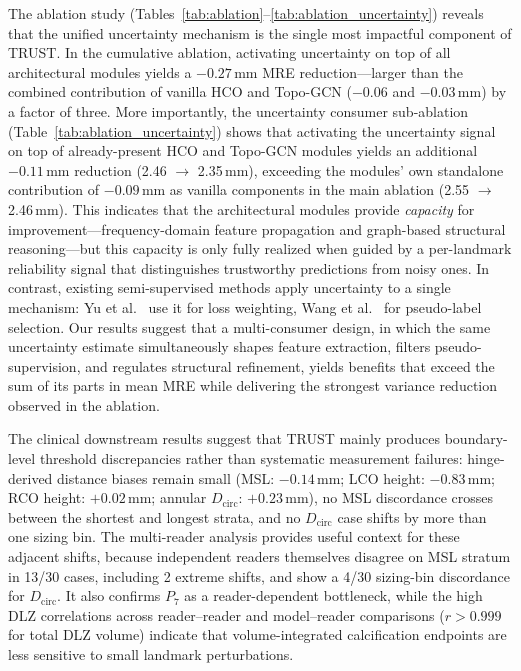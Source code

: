 \documentclass[conference]{IEEEtran}
\begin{document}
The ablation study (Tables~\ref{tab:ablation}--\ref{tab:ablation_uncertainty}) reveals that the unified uncertainty mechanism is the single most impactful component of TRUST. In the cumulative ablation, activating uncertainty on top of all architectural modules yields a $-0.27$\,mm MRE reduction---larger than the combined contribution of vanilla HCO and Topo-GCN ($-0.06$ and $-0.03$\,mm) by a factor of three. More importantly, the uncertainty consumer sub-ablation (Table~\ref{tab:ablation_uncertainty}) shows that activating the uncertainty signal on top of already-present HCO and Topo-GCN modules yields an additional $-0.11$\,mm reduction (2.46 $\to$ 2.35\,mm), exceeding the modules' own standalone contribution of $-0.09$\,mm as vanilla components in the main ablation (2.55 $\to$ 2.46\,mm). This indicates that the architectural modules provide \emph{capacity} for improvement---frequency-domain feature propagation and graph-based structural reasoning---but this capacity is only fully realized when guided by a per-landmark reliability signal that distinguishes trustworthy predictions from noisy ones. In contrast, existing semi-supervised methods apply uncertainty to a single mechanism: Yu et al.~\cite{Yu2019_uncertainty_aware} use it for loss weighting, Wang et al.~\cite{Wang2022_u2pl} for pseudo-label selection. Our results suggest that a multi-consumer design, in which the same uncertainty estimate simultaneously shapes feature extraction, filters pseudo-supervision, and regulates structural refinement, yields benefits that exceed the sum of its parts in mean MRE while delivering the strongest variance reduction observed in the ablation.

{\color{red} The clinical downstream results suggest that TRUST mainly produces boundary-level threshold discrepancies rather than systematic measurement failures: hinge-derived distance biases remain small (MSL: $-0.14$\,mm; LCO height: $-0.83$\,mm; RCO height: $+0.02$\,mm; annular $D_{\text{circ}}$: $+0.23$\,mm), no MSL discordance crosses between the shortest and longest strata, and no $D_{\text{circ}}$ case shifts by more than one sizing bin. The multi-reader analysis provides useful context for these adjacent shifts, because independent readers themselves disagree on MSL stratum in 13/30 cases, including 2 extreme shifts, and show a 4/30 sizing-bin discordance for $D_{\text{circ}}$. It also confirms $P_7$ as a reader-dependent bottleneck, while the high DLZ correlations across reader--reader and model--reader comparisons ($r > 0.999$ for total DLZ volume) indicate that volume-integrated calcification endpoints are less sensitive to small landmark perturbations.}
\end{document}
